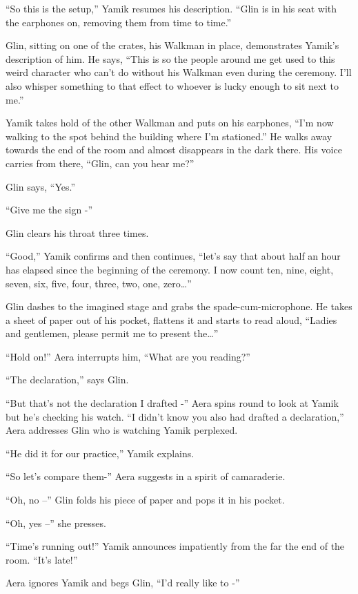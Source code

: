 \documentclass[twoside,11pt]{book}
\begin{document}
``So this is the setup,'' Yamik resumes his description. ``Glin is in his seat
with the earphones on, removing them from time to time.''

Glin, sitting on one of the crates, his Walkman in place, demonstrates Yamik's description of him. He says,
``This is so the people around me get used to this weird
character who can't do without his Walkman even during the ceremony. I'll also whisper something to that effect to
whoever is lucky enough to sit next to me.''

Yamik takes hold of the other Walkman and puts on his earphones, ``I'm now walking to the spot behind the
building where I'm stationed.'' He walks away towards the end of the room and almost disappears in the
dark there. His voice carries from there, ``Glin, can you hear me?''

Glin says, ``Yes.''

``Give me the sign -''

Glin clears his throat three times.

``Good,'' Yamik confirms and then continues, ``let's say that about half an hour
has elapsed since the beginning of the ceremony. I now count ten, nine, eight, seven, six, five, four, three, two, one,
zero{\dots}''

Glin dashes to the imagined stage and grabs the spade-cum-microphone. He takes a sheet of paper out of
his pocket, flattens it and starts to read aloud, ``Ladies and gentlemen, please permit me to present
the{\dots}''

``Hold on!'' Aera interrupts him, ``What are you reading?''

``The declaration,'' says Glin.

``But that's not the declaration I drafted -'' Aera spins round to look at Yamik but he's
checking his watch. ``I didn't know you also had drafted a declaration,'' Aera addresses Glin
who is watching Yamik perplexed.

``He did it for our practice,'' Yamik explains.

``So let's compare them-'' Aera suggests in a spirit of camaraderie.

``Oh, no --'' Glin folds his piece of paper and pops it in his pocket.

``Oh, yes --'' she presses.

``Time's running out!'' Yamik announces impatiently from the far the end of the room.
``It's late!''

Aera ignores Yamik and begs Glin, ``I'd really like to -''
\end{document}
